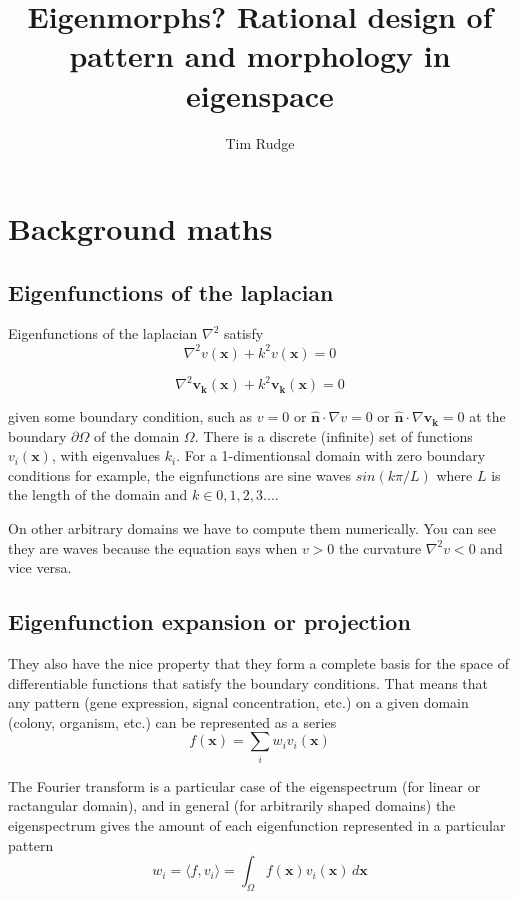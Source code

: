 \documentclass{article}
\let\oldhat\hat
\renewcommand{\vec}[1]{\mathbf{#1}}
\renewcommand{\hat}[1]{\oldhat{\mathbf{#1}}}
\begin{document}
 

\title{Eigenmorphs? Rational design of pattern and morphology in eigenspace}
\author{Tim Rudge}
\maketitle

\section{Background maths}
\subsection{Eigenfunctions of the laplacian}
Eigenfunctions of the laplacian $\nabla^2$ satisfy
\begin{equation}
\nabla^2 v(\vec{x}) + k^2 v(\vec{x}) = 0
\end{equation}

\begin{equation}
\nabla^2 \vec{v_k}(\vec{x}) + k^2 \vec{v_k}(\vec{x}) = 0
\end{equation}

given some boundary condition, such as $v=0$ or $\hat{\vec{n}}\cdot\nabla v=0$
or $\hat{\vec{n}}\cdot\nabla \vec{v_k}=0$
at the boundary $\partial\Omega$ of the domain $\Omega$. There is a discrete
(infinite) set of functions $v_i(\vec{x})$, with eigenvalues $k_i$.  For a
1-dimentionsal domain with zero boundary conditions for example, the
eignfunctions are sine waves $sin(k\pi/L)$ where $L$ is the length of the domain
and $k \in {0,1,2,3...}$.

On other arbitrary domains we have to compute them numerically. You can see they
are waves because the equation says when $v>0$ the curvature $\nabla^2v<0$ and
vice versa.

\subsection{Eigenfunction expansion or projection}
They also have the nice property that they form a complete basis for the space
of differentiable functions that satisfy the boundary conditions. That means that
any pattern (gene expression, signal concentration, etc.) on a given domain
(colony, organism, etc.) can be represented as a series
\begin{equation}
f(\vec{x}) = \sum_{i} w_i v_i(\vec{x})
\end{equation}

The Fourier transform is a particular case of the eigenspectrum (for linear or
ractangular domain), and in general (for arbitrarily shaped domains) the
eigenspectrum gives the amount of each eigenfunction represented in a
particular pattern
\begin{equation}
w_i = \langle f, v_i \rangle = \int_{\Omega} \! f(\vec{x}) v_i(\vec{x}) \, d\vec{x}
\end{equation}
\end{document}
